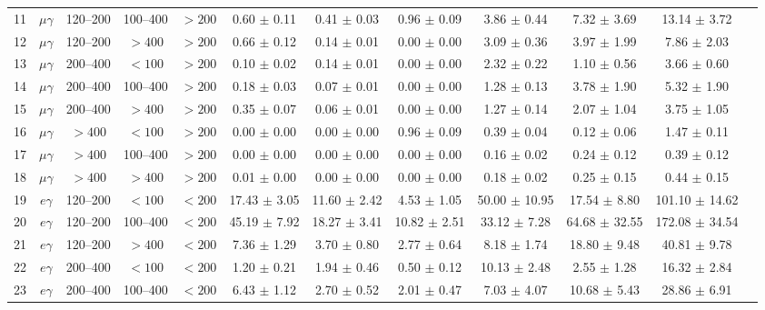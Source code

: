 \begin{table}[htbp]
{\begin{tabular}{|c|c|c|c|c|c|c|c|c|c|c|c|}
11 & $\mu\gamma$ & 120--200 & 100--400 & $>200$ & 0.60 $\pm$ 0.11 & 0.41 $\pm$ 0.03 & 0.96 $\pm$ 0.09 & 3.86 $\pm$ 0.44 & 7.32 $\pm$ 3.69 & 13.14 $\pm$ 3.72 &  \\
12 & $\mu\gamma$ & 120--200 & $>400$ & $>200$ & 0.66 $\pm$ 0.12 & 0.14 $\pm$ 0.01 & 0.00 $\pm$ 0.00 & 3.09 $\pm$ 0.36 & 3.97 $\pm$ 1.99 & 7.86 $\pm$ 2.03 &  \\
13 & $\mu\gamma$ & 200--400 & $<100$ & $>200$ & 0.10 $\pm$ 0.02 & 0.14 $\pm$ 0.01 & 0.00 $\pm$ 0.00 & 2.32 $\pm$ 0.22 & 1.10 $\pm$ 0.56 & 3.66 $\pm$ 0.60 &  \\
14 & $\mu\gamma$ & 200--400 & 100--400 & $>200$ & 0.18 $\pm$ 0.03 & 0.07 $\pm$ 0.01 & 0.00 $\pm$ 0.00 & 1.28 $\pm$ 0.13 & 3.78 $\pm$ 1.90 & 5.32 $\pm$ 1.90 &  \\
15 & $\mu\gamma$ & 200--400 & $>400$ & $>200$ & 0.35 $\pm$ 0.07 & 0.06 $\pm$ 0.01 & 0.00 $\pm$ 0.00 & 1.27 $\pm$ 0.14 & 2.07 $\pm$ 1.04 & 3.75 $\pm$ 1.05 &  \\
16 & $\mu\gamma$ & $>400$ & $<100$ & $>200$ & 0.00 $\pm$ 0.00 & 0.00 $\pm$ 0.00 & 0.96 $\pm$ 0.09 & 0.39 $\pm$ 0.04 & 0.12 $\pm$ 0.06 & 1.47 $\pm$ 0.11 &  \\
17 & $\mu\gamma$ & $>400$ & 100--400 & $>200$ & 0.00 $\pm$ 0.00 & 0.00 $\pm$ 0.00 & 0.00 $\pm$ 0.00 & 0.16 $\pm$ 0.02 & 0.24 $\pm$ 0.12 & 0.39 $\pm$ 0.12 &  \\
18 & $\mu\gamma$ & $>400$ & $>400$ & $>200$ & 0.01 $\pm$ 0.00 & 0.00 $\pm$ 0.00 & 0.00 $\pm$ 0.00 & 0.18 $\pm$ 0.02 & 0.25 $\pm$ 0.15 & 0.44 $\pm$ 0.15 &  \\
\hline
19 & $e\gamma$ & 120--200 & $<100$ & $<200$ & 17.43 $\pm$ 3.05 & 11.60 $\pm$ 2.42 & 4.53 $\pm$ 1.05 & 50.00 $\pm$ 10.95 & 17.54 $\pm$ 8.80 & 101.10 $\pm$ 14.62 &  \\
20 & $e\gamma$ & 120--200 & 100--400 & $<200$ & 45.19 $\pm$ 7.92 & 18.27 $\pm$ 3.41 & 10.82 $\pm$ 2.51 & 33.12 $\pm$ 7.28 & 64.68 $\pm$ 32.55 & 172.08 $\pm$ 34.54 &  \\
21 & $e\gamma$ & 120--200 & $>400$ & $<200$ & 7.36 $\pm$ 1.29 & 3.70 $\pm$ 0.80 & 2.77 $\pm$ 0.64 & 8.18 $\pm$ 1.74 & 18.80 $\pm$ 9.48 & 40.81 $\pm$ 9.78 &  \\
22 & $e\gamma$ & 200--400 & $<100$ & $<200$ & 1.20 $\pm$ 0.21 & 1.94 $\pm$ 0.46 & 0.50 $\pm$ 0.12 & 10.13 $\pm$ 2.48 & 2.55 $\pm$ 1.28 & 16.32 $\pm$ 2.84 &  \\
23 & $e\gamma$ & 200--400 & 100--400 & $<200$ & 6.43 $\pm$ 1.12 & 2.70 $\pm$ 0.52 & 2.01 $\pm$ 0.47 & 7.03 $\pm$ 4.07 & 10.68 $\pm$ 5.43 & 28.86 $\pm$ 6.91 &  \\

\end{tabular}}
\end{table}
